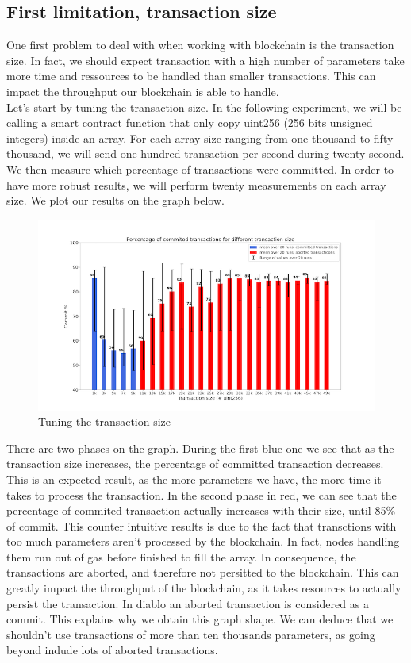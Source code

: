 \documentclass{article}
\begin{document}
\subsection{First limitation, transaction size}
One first problem to deal with when working with blockchain is the transaction size. In fact, we should expect
transaction with a high number of parameters take more time and ressources to be handled than smaller transactions. This
can impact the throughput our blockchain is able to handle.\\
Let's start by tuning the transaction size. In the following experiment, we will be calling a smart contract function
that only copy uint256 (256 bits unsigned integers) inside an array. For each array size ranging from one thousand
to fifty thousand, we will send one hundred transaction per second during twenty second. We then measure which percentage of transactions were committed. In order to have more robust
results, we will perform twenty measurements on each array size. We plot our results on the graph below.
\begin{figure}[H]
    \hspace*{-1.55cm}
    \includegraphics[scale=0.75]{max_array_length}
    \hspace{2mm}%
    \caption{Tuning the transaction size}
\end{figure}
There are two phases on the graph. During the first blue one we see that as the transaction size increases, the percentage of committed transaction decreases. This is an expected result, as the more parameters we have, the more time it takes to process the transaction. In the second phase in red, we can see that the percentage of commited transaction actually increases with their size, until 85\% of commit. This counter intuitive results is due to the fact that transctions with too much parameters aren't processed by the blockchain. In fact, nodes handling them run out of gas before finished to fill the array. In consequence, the transactions are aborted, and therefore not persitted to the blockchain. This can greatly impact the throughput of the blockchain, as it takes resources to actually persist the transaction. In diablo an aborted transaction is considered as a commit. This explains why we obtain this graph shape. We can deduce that we shouldn't use transactions of more than ten thousands parameters, as going beyond indude lots of aborted transactions.
\end{document}

